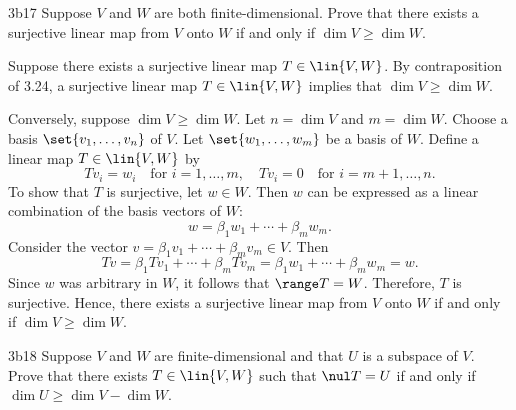 \begin{exercise}{3b17}
    Suppose $V$ and $W$ are both finite-dimensional.
	Prove that there exists a surjective linear map from $V$ onto $W$ if and only if $\dim V \geq \dim W$.
\end{exercise}

\begin{sol}
    Suppose there exists a surjective linear map $T \in \lin{V, W}$.
	By contraposition of 3.24, a surjective linear map $T \in \lin{V, W}$ implies that $\dim V \geq \dim W$.

    Conversely, suppose $\dim V \geq \dim W$.
	Let $n = \dim V$ and $m = \dim W$.
	Choose a basis $\set{v_1, \ldots, v_n}$ of $V$.
	Let $\set{w_1, \ldots, w_m}$ be a basis of $W$.
	Define a linear map $T \in \lin{V, W}$ by
    \[
    	Tv_i = w_i \quad \text{for } i = 1, \ldots, m, \quad Tv_i = 0 \quad \text{for } i = m + 1, \ldots, n.
    \]
    To show that $T$ is surjective, let $w \in W$.
	Then $w$ can be expressed as a linear combination of the basis vectors of $W$:
    \[
    	w = \beta_1 w_1 + \cdots + \beta_m w_m.
    \]
    Consider the vector $v = \beta_1 v_1 + \cdots + \beta_m v_m \in V$.
	Then
    \[
    	Tv = \beta_1 Tv_1 + \cdots + \beta_m Tv_m = \beta_1 w_1 + \cdots + \beta_m w_m = w.
    \]
    Since $w$ was arbitrary in $W$, it follows that $\range T = W$.
	Therefore, $T$ is surjective.
	Hence, there exists a surjective linear map from $V$ onto $W$ if and only if $\dim V \geq \dim W$.
\end{sol}

\begin{exercise}{3b18}
    Suppose $V$ and $W$ are finite-dimensional and that $U$ is a subspace of $V$.
	Prove that there exists $T \in \lin{V, W}$ such that $\nul T = U$ if and only if $\dim U \geq \dim V - \dim W$.
\end{exercise}

